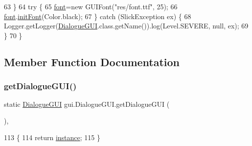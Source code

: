 \begin{DoxyCode}
63         \}
64         \textcolor{keywordflow}{try} \{
65             \mbox{\hyperlink{classgui_1_1_dialogue_g_u_i_a045cc33fd00133f73a614eb061a07d2f}{font}}=\textcolor{keyword}{new} GUIFont(\textcolor{stringliteral}{"res/font.ttf"}, 25);
66             \mbox{\hyperlink{classgui_1_1_dialogue_g_u_i_a045cc33fd00133f73a614eb061a07d2f}{font}}.\mbox{\hyperlink{classgui_1_1_g_u_i_font_ae1fccb6783e7c0f11fdcedd36362585d}{initFont}}(Color.black);
67         \} \textcolor{keywordflow}{catch} (SlickException ex) \{
68             Logger.getLogger(\mbox{\hyperlink{classgui_1_1_dialogue_g_u_i_a576d9a1c4f0132c3910dfd5206a4a094}{DialogueGUI}}.class.getName()).log(Level.SEVERE, null, ex);
69         \}
70     \}
\end{DoxyCode}


\subsection{Member Function Documentation}
\mbox{\label{classgui_1_1_dialogue_g_u_i_a274435a784994cf896865d71e3e6f5a3}} 
\subsubsection{\texorpdfstring{get\+Dialogue\+G\+U\+I()}{getDialogueGUI()}}
{\footnotesize\ttfamily static \mbox{\hyperlink{classgui_1_1_dialogue_g_u_i}{Dialogue\+G\+UI}} gui.\+Dialogue\+G\+U\+I.\+get\+Dialogue\+G\+UI (\begin{DoxyParamCaption}{ }\end{DoxyParamCaption})\hspace{0.3cm}{\ttfamily [inline]}, {\ttfamily [static]}}


\begin{DoxyCode}
113                                                \{
114         \textcolor{keywordflow}{return} \mbox{\hyperlink{classgui_1_1_dialogue_g_u_i_a1e0fe0a2da8282c913f294972362bbfe}{instance}};
115     \}
\end{DoxyCode}
\mbox{\label{classgui_1_1_dialogue_g_u_i_a3badcdab9688173faa3d1087eb6e735e}} 
